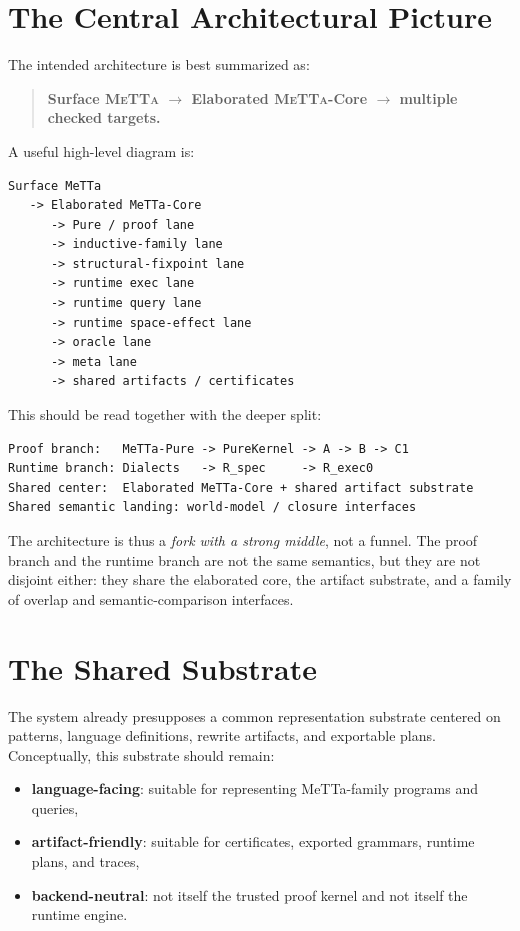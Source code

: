 \documentclass[11pt]{article}
\newcommand{\metta}{\textsc{MeTTa}}
\begin{document}
\section{The Central Architectural Picture}
The intended architecture is best summarized as:
\begin{quote}
\textbf{Surface \metta{} $\to$ Elaborated \metta-Core $\to$ multiple checked targets.}
\end{quote}

A useful high-level diagram is:
\begin{verbatim}
Surface MeTTa
   -> Elaborated MeTTa-Core
      -> Pure / proof lane
      -> inductive-family lane
      -> structural-fixpoint lane
      -> runtime exec lane
      -> runtime query lane
      -> runtime space-effect lane
      -> oracle lane
      -> meta lane
      -> shared artifacts / certificates
\end{verbatim}

This should be read together with the deeper split:
\begin{verbatim}
Proof branch:   MeTTa-Pure -> PureKernel -> A -> B -> C1
Runtime branch: Dialects   -> R_spec     -> R_exec0
Shared center:  Elaborated MeTTa-Core + shared artifact substrate
Shared semantic landing: world-model / closure interfaces
\end{verbatim}

The architecture is thus a \emph{fork with a strong middle}, not a funnel. The proof branch and the runtime branch are not the same semantics, but they are not disjoint either: they share the elaborated core, the artifact substrate, and a family of overlap and semantic-comparison interfaces.

\section{The Shared Substrate}
The system already presupposes a common representation substrate centered on patterns, language definitions, rewrite artifacts, and exportable plans. Conceptually, this substrate should remain:
\begin{itemize}
  \item \textbf{language-facing}: suitable for representing MeTTa-family programs and queries,
  \item \textbf{artifact-friendly}: suitable for certificates, exported grammars, runtime plans, and traces,
  \item \textbf{backend-neutral}: not itself the trusted proof kernel and not itself the runtime engine.
\end{itemize}
\end{document}
